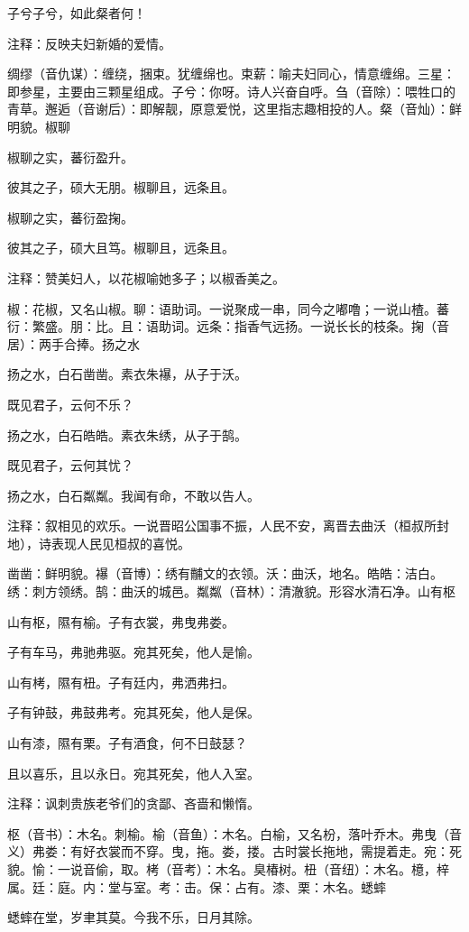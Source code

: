 \documentclass[12pt,UTF8]{ctexbook}
\begin{document}
子兮子兮，如此粲者何！

注释：反映夫妇新婚的爱情。

绸缪（音仇谋）：缠绕，捆束。犹缠绵也。束薪：喻夫妇同心，情意缠绵。三星：即参星，主要由三颗星组成。子兮：你呀。诗人兴奋自呼。刍（音除）：喂牲口的青草。邂逅（音谢后）：即解靓，原意爱悦，这里指志趣相投的人。粲（音灿）：鲜明貌。椒聊

椒聊之实，蕃衍盈升。

彼其之子，硕大无朋。椒聊且，远条且。

椒聊之实，蕃衍盈掬。

彼其之子，硕大且笃。椒聊且，远条且。

注释：赞美妇人，以花椒喻她多子；以椒香美之。

椒：花椒，又名山椒。聊：语助词。一说聚成一串，同今之嘟噜；一说山楂。蕃衍：繁盛。朋：比。且：语助词。远条：指香气远扬。一说长长的枝条。掬（音居）：两手合捧。扬之水

扬之水，白石凿凿。素衣朱襮，从子于沃。

既见君子，云何不乐？

扬之水，白石皓皓。素衣朱绣，从子于鹄。

既见君子，云何其忧？

扬之水，白石粼粼。我闻有命，不敢以告人。

注释：叙相见的欢乐。一说晋昭公国事不振，人民不安，离晋去曲沃（桓叔所封地），诗表现人民见桓叔的喜悦。

凿凿：鲜明貌。襮（音博）：绣有黼文的衣领。沃：曲沃，地名。皓皓：洁白。绣：刺方领绣。鹄：曲沃的城邑。粼粼（音林）：清澈貌。形容水清石净。山有枢

山有枢，隰有榆。子有衣裳，弗曳弗娄。

子有车马，弗驰弗驱。宛其死矣，他人是愉。

山有栲，隰有杻。子有廷内，弗洒弗扫。

子有钟鼓，弗鼓弗考。宛其死矣，他人是保。

山有漆，隰有栗。子有酒食，何不日鼓瑟？

且以喜乐，且以永日。宛其死矣，他人入室。

注释：讽刺贵族老爷们的贪鄙、吝啬和懒惰。

枢（音书）：木名。刺榆。榆（音鱼）：木名。白榆，又名枌，落叶乔木。弗曳（音义）弗娄：有好衣裳而不穿。曳，拖。娄，搂。古时裳长拖地，需提着走。宛：死貌。愉：一说音偷，取。栲（音考）：木名。臭椿树。杻（音纽）：木名。檍，梓属。廷：庭。内：堂与室。考：击。保：占有。漆、栗：木名。蟋蟀

蟋蟀在堂，岁聿其莫。今我不乐，日月其除。
\end{document}
